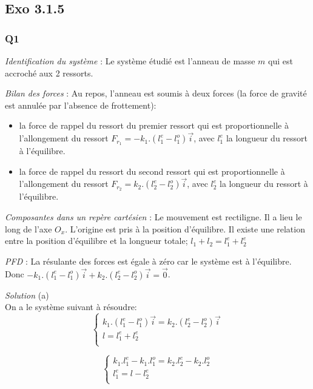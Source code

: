 \documentclass[]{book}
\theoremstyle{definition}
\begin{document}
\subsection*{Exo 3.1.5}
	
\subsubsection*{Q1}
\emph{Identification du syst\`eme} : Le syst\`eme \'etudi\'e est l'anneau de masse
$m$ qui est accroch\'e aux 2 ressorts.


\emph{Bilan des forces} : Au repos, l'anneau est soumis \`a deux forces (la force de gravit\'e est annul\'ee par l'absence de frottement): 
\begin{itemize}
\item la force de rappel du ressort du premier ressort qui est proportionnelle \`a l'allongement
du ressort $F_{r_1} = -k_1.(l^{e}_{1} - l^{o}_{1})\overrightarrow{i}$, avec $l^{e}_{1}$ la longueur du ressort \`a l'\'equilibre.
\item la force de rappel du ressort du second ressort qui est proportionnelle \`a l'allongement
du ressort $F_{r_2} = k_2.(l^{e}_{2} - l^{o}_{2})\overrightarrow{i}$, avec $l^{e}_{2}$ la longueur du ressort \`a l'\'equilibre.
\end{itemize}


\emph{Composantes dans un rep\`ere cart\'esien} : Le mouvement est rectiligne.
Il a lieu le long de l'axe $O_x$. L'origine est pris \`a la position d'\'equilibre. Il existe une relation entre la position d'\'equilibre et la longueur totale; $l_{1} + l_{2} = l^{e}_{1} + l^{e}_{2}$


\emph{PFD} : La r\'esulante des forces est \'egale \`a z\'ero car le syst\`eme est \`a l'\'equilibre. Donc 
$-k_1.(l^{e}_{1}- l^{o}_{1})\overrightarrow{i} + k_2.(l^{e}_{2}- l^{o}_{2})\overrightarrow{i}=\overrightarrow{0}$. 


\emph{Solution}
(a) \\
On a le syst\`eme suivant \`a r\'esoudre:
$$
\left\{
\begin{array}{l}
 k_1.(l^{e}_{1}- l^{o}_{1})\overrightarrow{i} = k_2.(l^{e}_{2}- l^{o}_{2})\overrightarrow{i} \\
 l = l^{e}_{1} + l^{e}_{2}\\
\end{array}
\right. 
$$

$$
\left\{
\begin{array}{l}
 k_1.l^{e}_{1} - k_1.l^{o}_{1} = k_2.l^{e}_{2} - k_2.l^{o}_{2} \\
 l^{e}_{1}  = l - l^{e}_{2}\\
\end{array}
\right. 
$$
\end{document}
